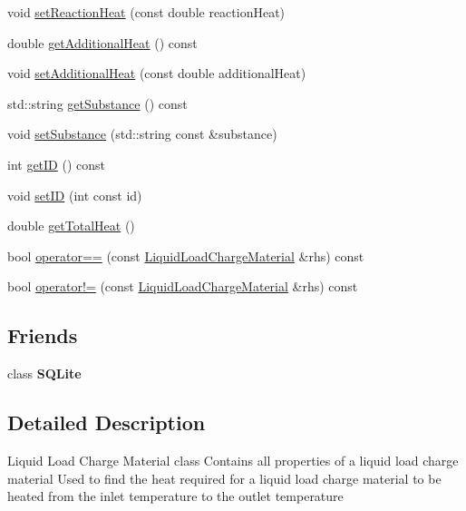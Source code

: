 \begin{DoxyCompactItemize}
\item 
void \hyperlink{class_liquid_load_charge_material_a793c7ebc2643b2af0eaf21b9cb788775}{set\+Reaction\+Heat} (const double reaction\+Heat)
\item 
double \hyperlink{class_liquid_load_charge_material_a6b79cd1aec59a7f7119a8abfa9e5859b}{get\+Additional\+Heat} () const
\item 
void \hyperlink{class_liquid_load_charge_material_a557c1f588cfb972ff0c7f748d6c2bd8f}{set\+Additional\+Heat} (const double additional\+Heat)
\item 
std\+::string \hyperlink{class_liquid_load_charge_material_a8f925c04c15ed889ba3fd7c4b628dbff}{get\+Substance} () const
\item 
void \hyperlink{class_liquid_load_charge_material_a85bb43270c6a11a1eaf51f00da16746a}{set\+Substance} (std\+::string const \&substance)
\item 
int \hyperlink{class_liquid_load_charge_material_a92591f91c6ed9fdda10733a439e86389}{get\+ID} () const
\item 
void \hyperlink{class_liquid_load_charge_material_a192946f14996795396354f3e15b9e30b}{set\+ID} (int const id)
\item 
double \hyperlink{class_liquid_load_charge_material_a51a9826325e2c34cd073b8766331d476}{get\+Total\+Heat} ()
\item 
bool \hyperlink{class_liquid_load_charge_material_ad2090d1628f26e46339e9e164b47d3a2}{operator==} (const \hyperlink{class_liquid_load_charge_material}{Liquid\+Load\+Charge\+Material} \&rhs) const
\item 
bool \hyperlink{class_liquid_load_charge_material_aa6ad825ee8ab1c7816ce3bf10260c0bb}{operator!=} (const \hyperlink{class_liquid_load_charge_material}{Liquid\+Load\+Charge\+Material} \&rhs) const
\end{DoxyCompactItemize}
\subsection*{Friends}
\begin{DoxyCompactItemize}
\item 
\mbox{\label{class_liquid_load_charge_material_a0102f3b3c0cbf96db6c49f071fa5e7cc}} 
class {\bfseries S\+Q\+Lite}
\end{DoxyCompactItemize}


\subsection{Detailed Description}
Liquid Load Charge Material class Contains all properties of a liquid load charge material Used to find the heat required for a liquid load charge material to be heated from the inlet temperature to the outlet temperature 

